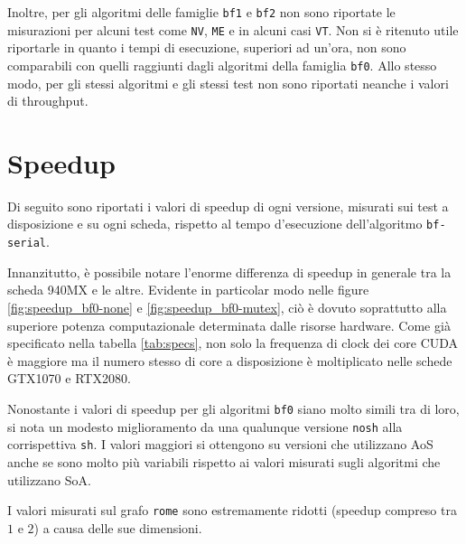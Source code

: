 \documentclass[12pt,a4paper,oneside]{book}
\begin{document}
	Inoltre, per gli algoritmi delle famiglie \texttt{bf1} e \texttt{bf2} non sono riportate le misurazioni per alcuni test come \texttt{NV}, \texttt{ME} e in alcuni casi \texttt{VT}. Non si è ritenuto utile riportarle in quanto i tempi di esecuzione, superiori ad un'ora, non sono comparabili con quelli raggiunti dagli algoritmi della famiglia \texttt{bf0}. Allo stesso modo, per gli stessi algoritmi e gli stessi test non sono riportati neanche i valori di throughput.
	
	\section{Speedup}
	Di seguito sono riportati i valori di speedup di ogni versione, misurati sui test a disposizione e su ogni scheda, rispetto al tempo d'esecuzione dell'algoritmo \texttt{bf-serial}.
	
	Innanzitutto, è possibile notare l'enorme differenza di speedup in generale tra la scheda 940MX e le altre. Evidente in particolar modo nelle figure \ref{fig:speedup_bf0-none} e \ref{fig:speedup_bf0-mutex}, ciò è dovuto soprattutto alla superiore potenza computazionale determinata dalle risorse hardware. Come già specificato nella tabella \ref{tab:specs}, non solo la frequenza di clock dei core CUDA è maggiore ma il numero stesso di core a disposizione è moltiplicato nelle schede GTX1070 e RTX2080.
	
	Nonostante i valori di speedup per gli algoritmi \texttt{bf0} siano molto simili tra di loro, si nota un modesto miglioramento da una qualunque versione \texttt{nosh} alla corrispettiva \texttt{sh}. I valori maggiori si ottengono su versioni che utilizzano AoS anche se sono molto più variabili rispetto ai valori misurati sugli algoritmi che utilizzano SoA.
	
	I valori misurati sul grafo \texttt{rome} sono estremamente ridotti (speedup compreso tra $1$ e $2$) a causa delle sue dimensioni.
	
\end{document}

